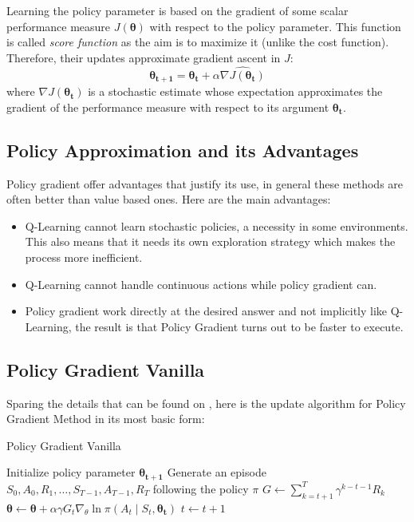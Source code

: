  Learning the policy parameter is based on the gradient of some scalar performance measure $J\left(\bm{\theta}\right)$ with respect to the policy parameter. This function is called \textit{score function} as the aim is to maximize it (unlike the cost function). Therefore, their updates approximate gradient ascent in $J$:
 \begin{equation}
 \bm{\theta_{t+1}} = \bm{\theta_t} + \alpha\widehat{\nabla J\left(\bm{\theta_t}\right)}
 \end{equation}
 where $\widehat{\nabla J\left(\bm{\theta_t}\right)}$ is a stochastic estimate whose expectation approximates the gradient
 of the performance measure with respect to its argument $\bm{\theta_t}$.
 
 \subsection{Policy Approximation and its Advantages}
 
 Policy gradient offer advantages that justify its use, in general these methods are often better than value based ones. Here are the main advantages:
 
 \begin{itemize}
 	\item Q-Learning cannot learn stochastic policies, a necessity in some environments. This also means that it needs its own exploration strategy which makes the process more inefficient.
 	\item Q-Learning cannot handle continuous actions while policy gradient can.
 	\item Policy gradient work directly at the desired answer and not implicitly like Q-Learning, the result is that Policy Gradient turns out to be faster to execute.
 \end{itemize}

\subsection{Policy Gradient Vanilla}
Sparing the details that can be found on \cite{RFIntroduction}, here is the update algorithm for Policy Gradient Method in its most basic form:

\begin{algorithm}
	\caption{Policy Gradient Vanilla}\label{PGVanilla}
	\begin{algorithmic}[1]
		\State Initialize policy parameter $\bm{\theta_{t+1}}$
		\State Generate an episode $S_0,A_0,R_1,\dots,S_{T-1},A_{T-1},R_T$ following the policy $\pi$
		\State $G \gets \sum_{k = t+1}^{T}\gamma^{k-t-1}R_k$
		\State $\bm{\theta} \gets \bm{\theta} + \alpha\gamma G_t\nabla_{\theta}\ln{\pi\left(A_t\mid S_t,\bm{\theta_t}\right)}$
		\State $t \gets t + 1$
		\EndWhile\label{time}
		\EndWhile\label{forever}
		\EndProcedure
	\end{algorithmic}
\end{algorithm}

